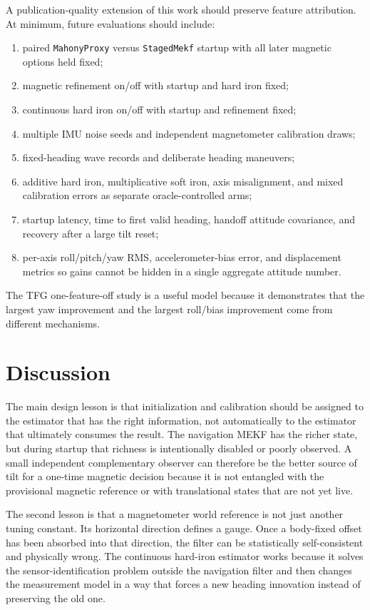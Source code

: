 \documentclass[conference]{IEEEtran}
\begin{document}
A publication-quality extension of this work should preserve feature attribution.
At minimum, future evaluations should include:
\begin{enumerate}
  \item paired \texttt{MahonyProxy} versus \texttt{StagedMekf} startup with all later
        magnetic options held fixed;
  \item magnetic refinement on/off with startup and hard iron fixed;
  \item continuous hard iron on/off with startup and refinement fixed;
  \item multiple IMU noise seeds and independent magnetometer calibration draws;
  \item fixed-heading wave records and deliberate heading maneuvers;
  \item additive hard iron, multiplicative soft iron, axis misalignment, and mixed
        calibration errors as separate oracle-controlled arms;
  \item startup latency, time to first valid heading, handoff attitude covariance,
        and recovery after a large tilt reset;
  \item per-axis roll/pitch/yaw RMS, accelerometer-bias error, and displacement metrics
        so gains cannot be hidden in a single aggregate attitude number.
\end{enumerate}
The TFG one-feature-off study is a useful model because it demonstrates that the
largest yaw improvement and the largest roll/bias improvement come from different
mechanisms.

\section{Discussion}
\label{sec:discussion}

The main design lesson is that initialization and calibration should be assigned to
the estimator that has the right information, not automatically to the estimator
that ultimately consumes the result.  The navigation MEKF has the richer state, but
during startup that richness is intentionally disabled or poorly observed.  A small
independent complementary observer can therefore be the better source of tilt for a
one-time magnetic decision because it is not entangled with the provisional magnetic
reference or with translational states that are not yet live.

The second lesson is that a magnetometer world reference is not just another tuning
constant.  Its horizontal direction defines a gauge.  Once a body-fixed offset has
been absorbed into that direction, the filter can be statistically self-consistent
and physically wrong.  The continuous hard-iron estimator works because it solves the
sensor-identification problem outside the navigation filter and then changes the
measurement model in a way that forces a new heading innovation instead of preserving
the old one.
\end{document}
